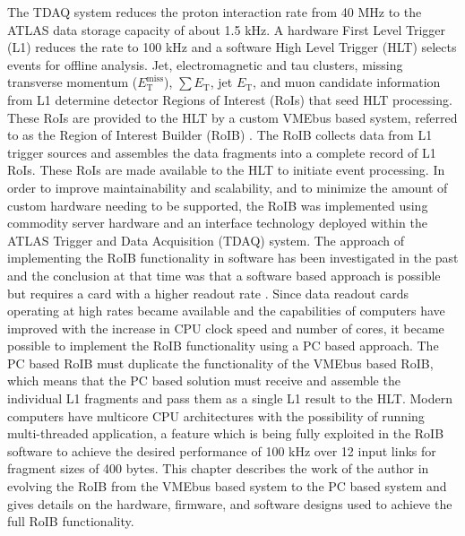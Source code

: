 The TDAQ system reduces the 
proton interaction rate from 40 MHz to the ATLAS data storage capacity of about 1.5 kHz. 
A hardware First Level Trigger (L1) reduces the rate to 100 kHz and a software High Level Trigger (HLT) selects events for offline analysis. 
Jet, electromagnetic and tau clusters, missing transverse momentum ($E_{\mathrm{T}}^{\mathrm{miss}}$), $\sum E_{\mathrm{T}}$, 
jet $E_{\mathrm{T}}$, and muon candidate information from L1 determine detector Regions of Interest (RoIs) that seed HLT processing. These RoIs are provided to the HLT by a custom VMEbus based system, referred to as the Region of Interest Builder (RoIB) \cite{vme_roib}.
The RoIB collects data from L1 
trigger sources and assembles the data fragments into a complete record of L1 RoIs. These RoIs are made available to the HLT to initiate event processing. In order to improve maintainability and scalability, and to minimize the amount of custom hardware needing to be supported, 
the RoIB was implemented using commodity server hardware and an interface technology deployed 
within the ATLAS Trigger and Data Acquisition (TDAQ) system. The approach of implementing the RoIB functionality in software has been investigated in the past 
and the conclusion at that time was that a software based approach is possible but requires a card with a higher readout rate \cite{swroib_past}. 
Since data readout cards operating at high rates became available and the capabilities of computers have improved with the increase 
in CPU clock speed and number of cores, it became possible to implement the RoIB functionality using a PC based approach. 
The PC based RoIB must duplicate the functionality of the VMEbus based RoIB,
 which means that the PC based solution must receive and assemble the
individual L1 fragments and pass them as a single L1 result to the HLT. Modern computers have multicore CPU architectures 
with the possibility of running multi-threaded application, a feature which is being fully exploited in the RoIB software to achieve 
the desired performance of 100 kHz over 12 input links for fragment sizes of 400 bytes.  
This chapter describes the work of the author in evolving the RoIB from the VMEbus based system to the PC based system and gives details on the hardware, 
firmware, and software designs used to achieve the full RoIB functionality. 




